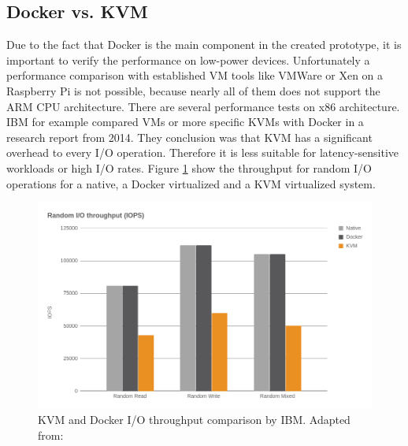 \subsection{Docker vs. KVM}
Due to the fact that Docker is the main component in the created prototype, it is important to verify the performance on low-power devices.
Unfortunately a performance comparison with established \ac{VM} tools like VMWare or Xen on a Raspberry Pi is not possible, because nearly all of them does not support the ARM \ac{CPU} architecture.
There are several performance tests on x86 architecture.
IBM for example compared \acp{VM} or more specific \acp{KVM} with Docker in a research report\autocite{IBM:Performance:2014} from 2014.
They conclusion was that \ac{KVM} has a significant overhead to every I/O operation.
Therefore it is less suitable for latency-sensitive workloads or high I/O rates.
Figure \ref{fig:ibm_kvm_docker_io} show the throughput for random I/O operations for a native, a Docker virtualized and a \ac{KVM} virtualized system.

\begin{figure}[H]
    \centering
    \includegraphics[width=\textwidth]{resources/images/performance_ibm_kvm_docker_io.png}
    \caption[KVM and Docker I/O throughput comparison by IBM]{KVM and Docker I/O throughput comparison by IBM. Adapted from: \autocite[p. 6]{IBM:Performance:2014}}
    \label{fig:ibm_kvm_docker_io}
\end{figure}

